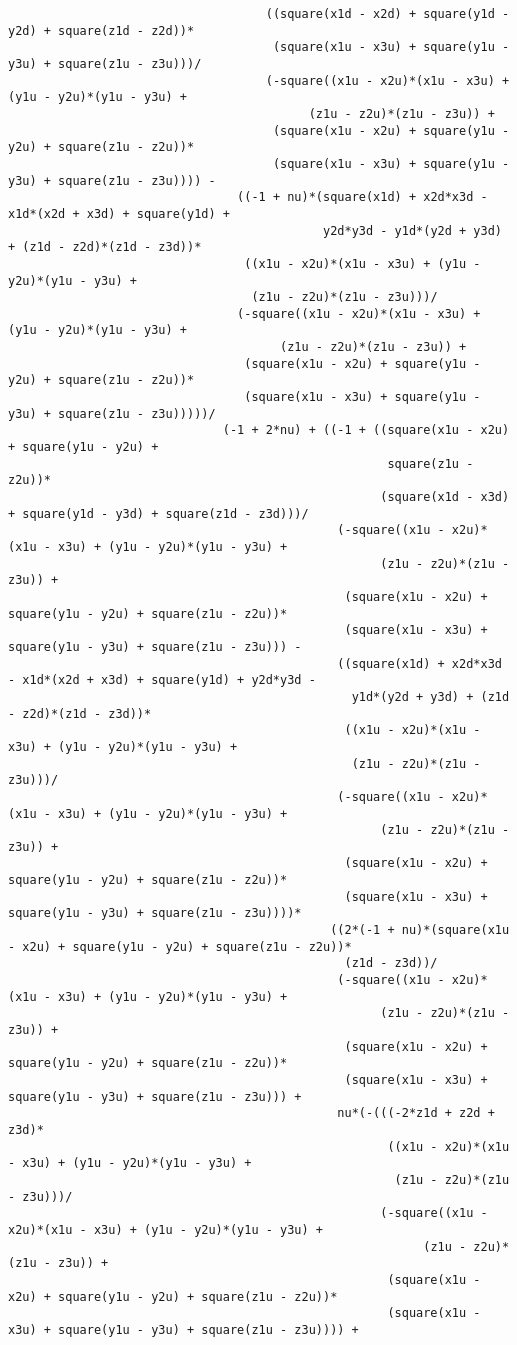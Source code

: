 \begin{lstlisting}
									((square(x1d - x2d) + square(y1d - y2d) + square(z1d - z2d))*
									 (square(x1u - x3u) + square(y1u - y3u) + square(z1u - z3u)))/
									(-square((x1u - x2u)*(x1u - x3u) + (y1u - y2u)*(y1u - y3u) + 
										  (z1u - z2u)*(z1u - z3u)) + 
									 (square(x1u - x2u) + square(y1u - y2u) + square(z1u - z2u))*
									 (square(x1u - x3u) + square(y1u - y3u) + square(z1u - z3u)))) - 
								((-1 + nu)*(square(x1d) + x2d*x3d - x1d*(x2d + x3d) + square(y1d) + 
											y2d*y3d - y1d*(y2d + y3d) + (z1d - z2d)*(z1d - z3d))*
								 ((x1u - x2u)*(x1u - x3u) + (y1u - y2u)*(y1u - y3u) + 
								  (z1u - z2u)*(z1u - z3u)))/
								(-square((x1u - x2u)*(x1u - x3u) + (y1u - y2u)*(y1u - y3u) + 
									  (z1u - z2u)*(z1u - z3u)) + 
								 (square(x1u - x2u) + square(y1u - y2u) + square(z1u - z2u))*
								 (square(x1u - x3u) + square(y1u - y3u) + square(z1u - z3u)))))/
							  (-1 + 2*nu) + ((-1 + ((square(x1u - x2u) + square(y1u - y2u) + 
													 square(z1u - z2u))*
													(square(x1d - x3d) + square(y1d - y3d) + square(z1d - z3d)))/
											  (-square((x1u - x2u)*(x1u - x3u) + (y1u - y2u)*(y1u - y3u) + 
													(z1u - z2u)*(z1u - z3u)) + 
											   (square(x1u - x2u) + square(y1u - y2u) + square(z1u - z2u))*
											   (square(x1u - x3u) + square(y1u - y3u) + square(z1u - z3u))) - 
											  ((square(x1d) + x2d*x3d - x1d*(x2d + x3d) + square(y1d) + y2d*y3d - 
												y1d*(y2d + y3d) + (z1d - z2d)*(z1d - z3d))*
											   ((x1u - x2u)*(x1u - x3u) + (y1u - y2u)*(y1u - y3u) + 
												(z1u - z2u)*(z1u - z3u)))/
											  (-square((x1u - x2u)*(x1u - x3u) + (y1u - y2u)*(y1u - y3u) + 
													(z1u - z2u)*(z1u - z3u)) + 
											   (square(x1u - x2u) + square(y1u - y2u) + square(z1u - z2u))*
											   (square(x1u - x3u) + square(y1u - y3u) + square(z1u - z3u))))*
											 ((2*(-1 + nu)*(square(x1u - x2u) + square(y1u - y2u) + square(z1u - z2u))*
											   (z1d - z3d))/
											  (-square((x1u - x2u)*(x1u - x3u) + (y1u - y2u)*(y1u - y3u) + 
													(z1u - z2u)*(z1u - z3u)) + 
											   (square(x1u - x2u) + square(y1u - y2u) + square(z1u - z2u))*
											   (square(x1u - x3u) + square(y1u - y3u) + square(z1u - z3u))) + 
											  nu*(-(((-2*z1d + z2d + z3d)*
													 ((x1u - x2u)*(x1u - x3u) + (y1u - y2u)*(y1u - y3u) + 
													  (z1u - z2u)*(z1u - z3u)))/
													(-square((x1u - x2u)*(x1u - x3u) + (y1u - y2u)*(y1u - y3u) + 
														  (z1u - z2u)*(z1u - z3u)) + 
													 (square(x1u - x2u) + square(y1u - y2u) + square(z1u - z2u))*
													 (square(x1u - x3u) + square(y1u - y3u) + square(z1u - z3u)))) + 

\end{lstlisting}
